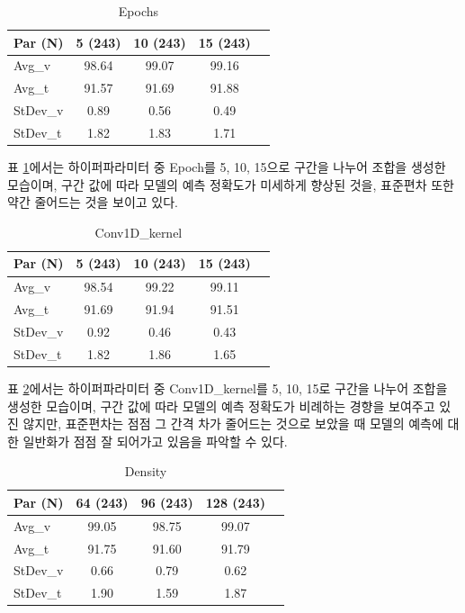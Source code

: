 \documentclass{kcc}
\begin{document}
\begin{table}[!ht]
\centering
\setlength{\belowcaptionskip}{5pt}
\caption{Epochs}
\label{tab:Epochs}
\begin{tabular}{@{}lcccc@{}} 
\toprule
{\bfseries Par (N)} & 5 (243) & 10 (243) & 15 (243) \\
\midrule
Avg\_v  & 98.64 & 99.07 & 99.16 \\
Avg\_t  & 91.57 & 91.69 & 91.88 \\
StDev\_v & 0.89 & 0.56 & 0.49 \\
StDev\_t & 1.82 & 1.83 & 1.71 \\
\bottomrule
\end{tabular}
\end{table}

표 \ref{tab:Epochs}에서는 하이퍼파라미터 중 Epoch를 5, 10, 15으로 구간을 나누어 조합을 생성한 모습이며, 구간 값에 따라 모델의 예측 정확도가 미세하게 향상된 것을, 표준편차 또한 약간 줄어드는 것을 보이고 있다.

\begin{table}[!ht]
\centering
\setlength{\belowcaptionskip}{5pt}
\caption{Conv1D\_kernel}
\label{tab:Conv1D_kernel}
\begin{tabular}{@{}lcccc@{}} 
\toprule
{\bfseries Par (N)} & 5 (243) & 10 (243) & 15 (243) \\
\midrule
Avg\_v  & 98.54 & 99.22 & 99.11 \\
Avg\_t  & 91.69 & 91.94 & 91.51 \\
StDev\_v & 0.92 & 0.46 & 0.43 \\
StDev\_t & 1.82 & 1.86 & 1.65 \\
\bottomrule
\end{tabular}
\end{table}

표 \ref{tab:Conv1D_kernel}에서는 하이퍼파라미터 중 Conv1D\_kernel를 5, 10, 15로 구간을 나누어 조합을 생성한 모습이며, 구간 값에 따라 모델의 예측 정확도가 비례하는 경향을 보여주고 있진 않지만, 표준편차는 점점 그 간격 차가 줄어드는 것으로 보았을 때 모델의 예측에 대한 일반화가 점점 잘 되어가고 있음을 파악할 수 있다.

\begin{table}[!ht]
\centering
\setlength{\belowcaptionskip}{5pt}
\caption{Density}
\label{tab:Density}
\begin{tabular}{@{}lcccc@{}} 
\toprule
{\bfseries Par (N)} & 64 (243) & 96 (243) & 128 (243) \\
\midrule
Avg\_v  & 99.05 & 98.75 & 99.07 \\
Avg\_t  & 91.75 & 91.60 & 91.79 \\
StDev\_v & 0.66 & 0.79 & 0.62 \\
StDev\_t & 1.90 & 1.59 & 1.87 \\
\bottomrule
\end{tabular}
\end{table}
\end{document}
